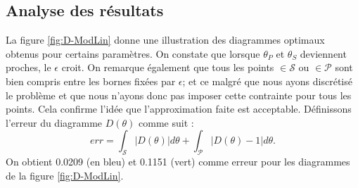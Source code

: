 \subsection{Analyse des résultats}
La figure \ref{fig:D-ModLin} donne une illustration des diagrammes optimaux obtenus pour certains paramètres. On constate que lorsque $\theta_P$ et $\theta_S$ deviennent proches, le $\epsilon$ croit. On remarque également que tous les points $\in \mathcal{S}$ ou $\in \mathcal{P}$ sont bien compris entre les bornes fixées par $\epsilon$; et ce malgré que nous ayons discrétisé le problème et que nous n'ayons donc pas imposer cette contrainte pour tous les points. Cela confirme l'idée que l'approximation faite est acceptable. Définissons l'erreur du diagramme $D(\theta)$ comme suit : 
\begin{equation} \label{eq:erreurDiagramme}
err = \int _{\mathcal{S}} |D(\theta)| d\theta + \int_{\mathcal{P}} |D(\theta) - 1| d\theta.
\end{equation}
On obtient 0.0209 (en bleu) et 0.1151 (vert) comme erreur pour les diagrammes de la figure \ref{fig:D-ModLin}. 
